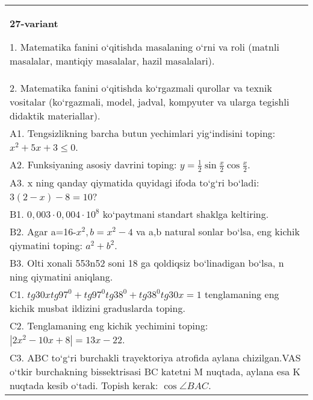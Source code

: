 \documentclass{article}
\begin{document}
\begin{tabular}{m{17cm}}
\textbf{27-variant}

1. Matematika fanini o‘qitishda masalaning o‘rni va roli (matnli masalalar, mantiqiy masalalar, hazil masalalari). \\
2. Matematika fanini o‘qitishda ko‘rgazmali qurollar va texnik vositalar (ko‘rgazmali, model, jadval, kompyuter va ularga tegishli didaktik materiallar). \\
A1. Tengsizlikning barcha butun yechimlari yig‘indisini toping: \(x^2 + 5x + 3 \leq 0\). \\
A2. Funksiyaning asosiy davrini toping: \(y = \frac{1}{2}\sin{\frac{x}{2}\cos\frac{x}{2}}\). \\
A3. x ning qanday qiymatida quyidagi ifoda to‘g‘ri bo‘ladi: \(3 (2 - x) - 8 = 10\)? \\
B1. \(0,003 \cdot 0,004 \cdot 10^{8}\) ko‘paytmani standart shaklga keltiring. \\
B2. Agar a=16-\(x^2, b=x^2-4\) va a,b natural sonlar bo‘lsa, eng kichik qiymatini toping: \(a^2 + b^2\). \\
B3. Olti xonali 553n52 soni 18 ga qoldiqsiz bo‘linadigan bo‘lsa, n ning qiymatini aniqlang. \\
C1. \(tg30xtg97^{0} + tg97^{0}tg38^{0} + tg38^{0}tg30x = 1\) tenglamaning eng kichik musbat ildizini graduslarda toping. \\
C2. Tenglamaning eng kichik yechimini toping: \(\left| 2x^2 - 10x + 8 \right| = 13x - 22\). \\
C3. ABC to‘g‘ri burchakli trayektoriya atrofida aylana chizilgan.VAS o‘tkir burchakning bissektrisasi BC katetni M nuqtada, aylana esa K nuqtada kesib o‘tadi. Topish kerak: \(\cos\angle BAC\). \\

\end{tabular}
\vspace{1cm}
\end{document}
